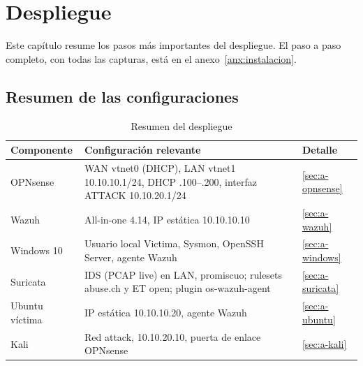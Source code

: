 \chapter{Despliegue}\label{cap:despliegue}

Este capítulo resume los pasos más importantes del despliegue. El paso a paso completo, con todas las capturas, está en
el anexo~\ref{anx:instalacion}.

\section{Resumen de las configuraciones}
\begin{table}[H]\centering\small
\begin{tabularx}{\linewidth}{l X l}
  \toprule
  \textbf{Componente} & \textbf{Configuración relevante} & \textbf{Detalle} \\
  \midrule
  OPNsense & WAN vtnet0 (DHCP), LAN vtnet1 10.10.10.1/24, DHCP .100--.200, interfaz ATTACK 10.10.20.1/24 & \ref{sec:a-opnsense} \\
  Wazuh    & All-in-one 4.14, IP estática 10.10.10.10 & \ref{sec:a-wazuh} \\
  Windows 10 & Usuario local Victima, Sysmon, OpenSSH Server, agente Wazuh & \ref{sec:a-windows} \\
  Suricata & IDS (PCAP live) en LAN, promiscuo; rulesets abuse.ch y ET open; plugin os-wazuh-agent & \ref{sec:a-suricata} \\
  Ubuntu víctima & IP estática 10.10.10.20, agente Wazuh & \ref{sec:a-ubuntu} \\
  Kali & Red attack, 10.10.20.10, puerta de enlace OPNsense & \ref{sec:a-kali} \\
  \bottomrule
\end{tabularx}
\caption{Resumen del despliegue}\label{tab:despliegue}
\end{table}


